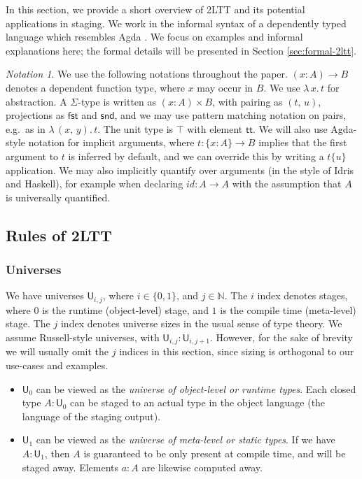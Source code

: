 \documentclass[acmsmall]{acmart}
\newcommand{\mit}[1]{\mathit{#1}}
\newcommand{\msf}[1]{\mathsf{#1}}
\newcommand{\mbb}[1]{\mathbb{#1}}
\renewcommand{\U}{\msf{U}}
\renewcommand{\tt}{\msf{tt}}
\newcommand{\fst}{\msf{fst}}
\newcommand{\snd}{\msf{snd}}
\theoremstyle{remark}
\newtheorem{notation}{Notation}
\begin{document}
In this section, we provide a short overview of 2LTT and its potential
applications in staging. We work in the informal syntax of a dependently typed
language which resembles Agda \cite{agdadocs}. We focus on examples and informal
explanations here; the formal details will be presented in Section \ref{sec:formal-2ltt}.

\begin{notation}\label{basic-notation}
We use the following notations throughout the paper. $(x : A) \to B$ denotes a
dependent function type, where $x$ may occur in $B$. We use $\lambda\,x.\,t$ for
abstraction. A $\Sigma$-type is written as $(x : A) \times B$, with pairing as
$(t,\,u)$, projections as $\fst$ and $\snd$, and we may use pattern matching
notation on pairs, e.g.\ as in $\lambda\,(x,\,y).\,t$. The unit type is $\top$
with element $\tt$. We will also use Agda-style notation for implicit arguments,
where $t : \{x : A\} \to B$ implies that the first argument to $t$ is inferred
by default, and we can override this by writing a $t \{u\}$ application. We may
also implicitly quantify over arguments (in the style of Idris and Haskell), for
example when declaring $\mit{id} : A \to A$ with the assumption that $A$ is
universally quantified.
\end{notation}

\subsection{Rules of 2LTT}

\subsubsection{Universes}
We have universes $\U_{i,j}$, where $i \in \{0,1\}$, and $j \in \mbb{N}$.  The
$i$ index denotes stages, where $0$ is the runtime (object-level) stage, and $1$
is the compile time (meta-level) stage. The $j$ index denotes universe sizes in
the usual sense of type theory. We assume Russell-style universes, with
$\U_{i,j} : \U_{i, j+1}$. However, for the sake of brevity we will usually omit
the $j$ indices in this section, since sizing is orthogonal to our use-cases and
examples.
\begin{itemize}
\item $\U_0$ can be viewed as the \emph{universe of object-level or runtime types}.
    Each closed type $A : \U_0$ can be staged to an actual type in the object language
    (the language of the staging output).
  \item $\U_1$ can be viewed as the \emph{universe of meta-level or static types}. If we
    have $A : \U_1$, then $A$ is guaranteed to be only present at compile time,
    and will be staged away. Elements $a : A$ are likewise computed away.
\end{itemize}
\end{document}
